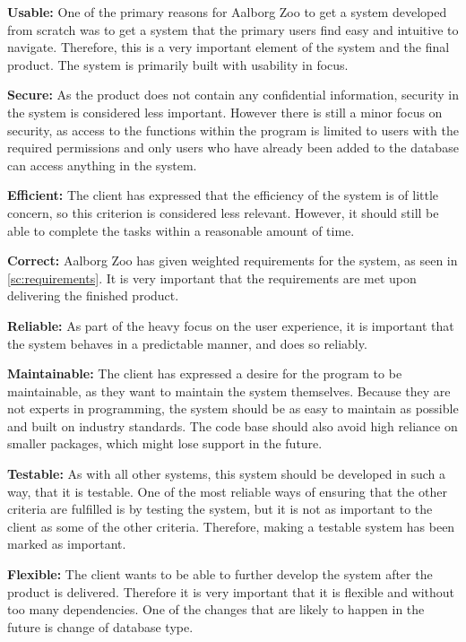 \textbf{Usable:} One of the primary reasons for Aalborg Zoo to get a system developed from scratch was to get a system that the primary users find easy and intuitive to navigate. Therefore, this is a very important element of the system and the final product. The system is primarily built with usability in focus.
\par
\textbf{Secure:} As the product does not contain any confidential information, security in the system is considered less important. However there is still a minor focus on security, as access to the functions within the program is limited to users with the required permissions and only users who have already been added to the database can access anything in the system.
\par
\textbf{Efficient:} The client has expressed that the efficiency of the system is of little concern, so this criterion is considered less relevant. However, it should still be able to complete the tasks within a reasonable amount of time.
\par
\textbf{Correct:} Aalborg Zoo has given weighted requirements for the system, as seen in \autoref{sc:requirements}. It is very important that the requirements are met upon delivering the finished product.

\textbf{Reliable:} As part of the heavy focus on the user experience, it is important that the system behaves in a predictable manner, and does so reliably.

\textbf{Maintainable:} The client has expressed a desire for the program to be maintainable, as they want to maintain the system themselves. Because they are not experts in programming, the system should be as easy to maintain as possible and built on industry standards. The code base should also avoid high reliance on smaller packages, which might lose support in the future.

\textbf{Testable:} As with all other systems, this system should be developed in such a way, that it is testable. One of the most reliable ways of ensuring that the other criteria are fulfilled is by testing the system, but it is not as important to the client as some of the other criteria. Therefore, making a testable system has been marked as important.

\textbf{Flexible:} The client wants to be able to further develop the system after the product is delivered. Therefore it is very important that it is flexible and without too many dependencies. One of the changes that are likely to happen in the future is change of database type.

